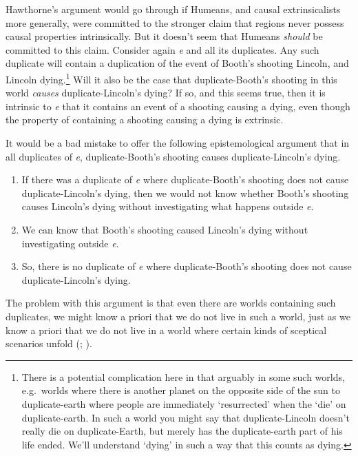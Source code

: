 \documentclass[
  11pt,
  letterpaper,
  DIV=11,
  numbers=noendperiod,
  twoside]{scrartcl}
\providecommand{\tightlist}{%
  \setlength{\itemsep}{0pt}\setlength{\parskip}{0pt}}
\begin{document}
Hawthorne's argument would go through if Humeans, and causal
extrinsicalists more generally, were committed to the stronger claim
that regions never possess causal properties intrinsically. But it
doesn't seem that Humeans \emph{should} be committed to this claim.
Consider again \emph{e} and all its duplicates. Any such duplicate will
contain a duplication of the event of Booth's shooting Lincoln, and
Lincoln dying.\footnote{There is a potential complication here in that
  arguably in some such worlds, e.g.~worlds where there is another
  planet on the opposite side of the sun to duplicate-earth where people
  are immediately `resurrected' when the `die' on duplicate-earth. In
  such a world you might say that duplicate-Lincoln doesn't really die
  on duplicate-Earth, but merely has the duplicate-earth part of his
  life ended. We'll understand `dying' in such a way that this counts as
  dying.} Will it also be the case that duplicate-Booth's shooting in
this world \emph{causes} duplicate-Lincoln's dying? If so, and this
seems true, then it is intrinsic to \emph{e} that it contains an event
of a shooting causing a dying, even though the property of containing a
shooting causing a dying is extrinsic.

It would be a bad mistake to offer the following epistemological
argument that in all duplicates of \emph{e}, duplicate-Booth's shooting
causes duplicate-Lincoln's dying.

\begin{enumerate}
\def\labelenumi{\arabic{enumi}.}
\tightlist
\item
  If there was a duplicate of \emph{e} where duplicate-Booth's shooting
  does not cause duplicate-Lincoln's dying, then we would not know
  whether Booth's shooting causes Lincoln's dying without investigating
  what happens outside \emph{e}.
\item
  We can know that Booth's shooting caused Lincoln's dying without
  investigating outside \emph{e}.
\item
  So, there is no duplicate of \emph{e} where duplicate-Booth's shooting
  does not cause duplicate-Lincoln's dying.
\end{enumerate}

The problem with this argument is that even there are worlds containing
such duplicates, we might know a priori that we do not live in such a
world, just as we know a priori that we do not live in a world where
certain kinds of sceptical scenarios unfold
(;
).
\end{document}
